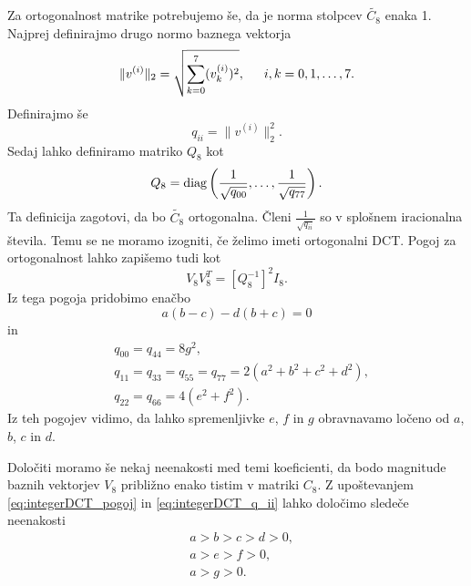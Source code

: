 \documentclass[a4paper,12pt,openright]{book}
\begin{document}
Za ortogonalnost matrike potrebujemo še, da je norma stolpcev $\widetilde{C_8}$ enaka 1. Najprej definirajmo drugo normo baznega vektorja
\begin{equation}
    \lVert v^{(i)} \rVert_2 = \sqrt{\sum_{k=0}^7 (v^{(i)}_{k})^2}, \indent i,k = 0,1,\ldots,7.
\end{equation}
Definirajmo še 
\begin{equation}
    q_{ii} = \lVert v^{(i)} \rVert_2^2.
\end{equation}
Sedaj lahko definiramo matriko $Q_8$ kot
\begin{equation}
    Q_8 = \hbox{diag}\left(\frac{1}{\sqrt{q_{00}}},\ldots,\frac{1}{\sqrt{q_{77}}}\right).
\end{equation}
Ta definicija zagotovi, da bo $\widetilde{C_8}$ ortogonalna. Členi $\frac{1}{\sqrt{q_{ii}}}$ so v splošnem iracionalna števila. Temu se ne moramo izogniti, če želimo imeti ortogonalni DCT. Pogoj za ortogonalnost lahko zapišemo tudi kot
\begin{equation}
    V_8 V_8^T = [Q_8^{-1}]^2I_8.
\end{equation}
Iz tega pogoja pridobimo enačbo
\begin{equation}
    a(b-c)-d(b+c) = 0
\label{eq:integerDCT_pogoj}
\end{equation}
in
\begin{equation}
  \begin{aligned}
    &q_{00} = q_{44} = 8g^2,\\
    &q_{11} = q_{33} = q_{55} = q_{77} = 2(a^2 + b^2 + c^2 + d^2),\\
    &q_{22} = q_{66} = 4(e^2 + f^2).
  \end{aligned}
\label{eq:integerDCT_q_ii}
\end{equation}
Iz teh pogojev vidimo, da lahko spremenljivke $e$, $f$ in $g$ obravnavamo ločeno od $a$, $b$, $c$ in $d$.\par
Določiti moramo še nekaj neenakosti med temi koeficienti, da bodo magnitude baznih vektorjev $V_8$ približno enako tistim v matriki $C_8$. Z upo\-šte\-van\-jem \eqref{eq:integerDCT_pogoj} in \eqref{eq:integerDCT_q_ii} lahko določimo sledeče neenakosti
\begin{align} 
  \label{eq:integerDCT_neenakost_1}
  &a > b > c > d > 0, \\
  \label{eq:integerDCT_neenakost_2}
  &a > e > f > 0, \\
  \label{eq:integerDCT_neenakost_3}
  &a > g > 0.
\end{align}
\end{document}

